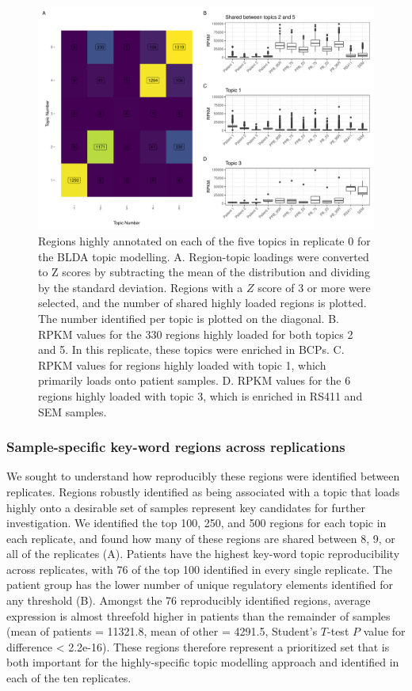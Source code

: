 \begin{figure}
    \centering
    \includegraphics[width=\textwidth]{plot/ch5/mll_bigwig_region_sharing_plot_rep0.pdf}
    \caption{Regions highly annotated on each of the five topics in replicate 0 for the BLDA topic modelling. A. Region-topic loadings were converted to Z scores by subtracting the mean of the distribution and dividing by the standard deviation. Regions with a $Z$ score of 3 or more were selected, and the number of shared highly loaded regions is plotted. The number identified per topic is plotted on the diagonal. B. RPKM values for the 330 regions highly loaded for both topics 2 and 5. In this replicate, these topics were enriched in BCPs. C. RPKM values for regions highly loaded with topic 1, which primarily loads onto patient samples. D. RPKM values for the 6 regions highly loaded with topic 3, which is enriched in RS411 and SEM samples.}
    \label{fig:mll_region_sharing}
\end{figure}

\subsubsection{Sample-specific key-word regions across replications}

We sought to understand how reproducibly these regions were identified between replicates. 
Regions robustly identified as being associated with a topic that loads highly onto a desirable set of samples represent key candidates for further investigation.
We identified the top 100, 250, and 500 regions for each topic in each replicate, and found how many of these regions are shared between 8, 9, or all of the replicates (A). Patients have the highest key-word topic reproducibility across replicates, with 76 of the top 100 identified in every single replicate. The patient group has the lower number of unique regulatory elements identified for any threshold (B). Amongst the 76 reproducibly identified regions, average expression is almost threefold higher in patients than the remainder of samples (mean of patients = 11321.8, mean of other = 4291.5, Student's $T$-test $P$ value for difference < 2.2e-16). These regions therefore represent a prioritized set that is both important for the highly-specific topic modelling approach and identified in each of the ten replicates. 

